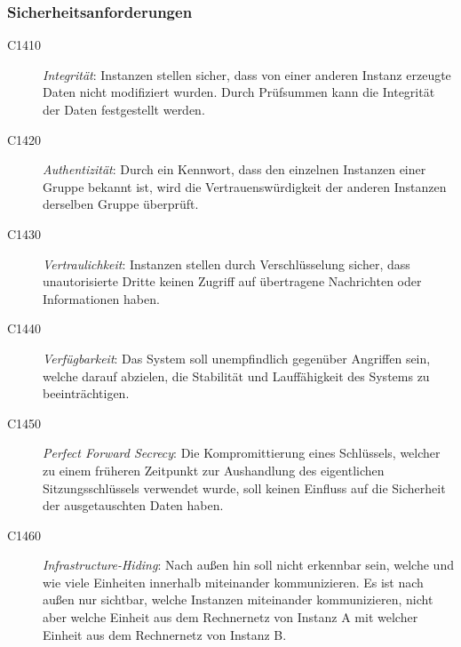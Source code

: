 \subsubsection{Sicherheitsanforderungen}
	\begin{description}
	  \item[C1410] \textit{Integrität}: Instanzen stellen sicher, dass von einer anderen Instanz erzeugte Daten nicht modifiziert wurden. 
	  Durch Prüfsummen kann die Integrität der Daten festgestellt werden.  
	  
	  \item[C1420] \textit{Authentizität}: Durch ein Kennwort, dass den einzelnen Instanzen einer Gruppe bekannt ist, wird die Vertrauenswürdigkeit der anderen Instanzen derselben Gruppe überprüft.
	  
	  \item[C1430] \textit{Vertraulichkeit}: Instanzen stellen durch Verschlüsselung sicher, dass unautorisierte Dritte keinen Zugriff auf übertragene Nachrichten oder Informationen haben.
	  
	  \item[C1440] \textit{Verfügbarkeit}: Das System soll unempfindlich gegenüber Angriffen sein, welche darauf abzielen, die Stabilität und Lauffähigkeit des Systems zu beeinträchtigen. 
	  
	  \item[C1450] \textit{Perfect Forward Secrecy}: Die Kompromittierung eines Schlüssels, welcher zu einem früheren Zeitpunkt zur Aushandlung des eigentlichen Sitzungsschlüssels verwendet wurde, soll keinen Einfluss auf die Sicherheit der ausgetauschten Daten haben.
	  
	  \item[C1460] \textit{Infrastructure-Hiding}: Nach außen hin soll nicht erkennbar sein, welche und wie viele Einheiten innerhalb  miteinander kommunizieren.
	  Es ist nach außen nur sichtbar, welche Instanzen miteinander kommunizieren, nicht aber welche Einheit aus dem Rechnernetz von Instanz A mit welcher Einheit aus dem Rechnernetz von Instanz B. 
	\end{description}

